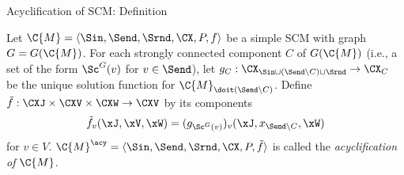 \begin{frame}{Acyclification of SCM: Definition}
  \begin{Def}
  Let $\C{M} = \langle \Sin, \Send, \Srnd, \CX, P, f \rangle$ be a simple SCM with graph $G = G(\C{M})$.
  For each strongly connected component $C$ of $G(\C{M})$ (i.e., a set of the form
  $\Sc^G(v)$ for $v \in \Send$), let
  $g_C : \CX_{\Sin \cup (\Send \setminus C) \cup \Srnd} \to \CX_C$
  be the unique solution function for $\C{M}_{\doit(\Send \setminus C)}$.
  Define $\tilde{f} : \CXJ \times \CXV \times \CXW \to \CXV$ by its components
  $$\tilde{f}_v(\xJ,\xV,\xW) = (g_{\Sc^G(v)})_v(\xJ,x_{\Send\setminus C},\xW)$$
  for $v \in V$.
  $\C{M}^\acy = \langle \Sin, \Send, \Srnd, \CX, P, \tilde{f} \rangle$ is called the
  \emph{acyclification of $\C{M}$}.
\end{Def}
\end{frame}

